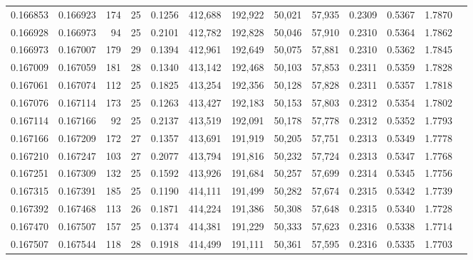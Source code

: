 \begin{tabular}{rrrrrrrrrrrrr}
0.166853 & 0.166923 & 174 &  25 &                                     0.1256 & 412,688 & 192,922 &  50,021 &  57,935 & 0.2309 & 0.5367 & 1.7870 \\
0.166928 & 0.166973 &  94 &  25 &                                     0.2101 & 412,782 & 192,828 &  50,046 &  57,910 & 0.2310 & 0.5364 & 1.7862 \\
0.166973 & 0.167007 & 179 &  29 &                                     0.1394 & 412,961 & 192,649 &  50,075 &  57,881 & 0.2310 & 0.5362 & 1.7845 \\
0.167009 & 0.167059 & 181 &  28 &                                     0.1340 & 413,142 & 192,468 &  50,103 &  57,853 & 0.2311 & 0.5359 & 1.7828 \\
0.167061 & 0.167074 & 112 &  25 &                                     0.1825 & 413,254 & 192,356 &  50,128 &  57,828 & 0.2311 & 0.5357 & 1.7818 \\
0.167076 & 0.167114 & 173 &  25 &                                     0.1263 & 413,427 & 192,183 &  50,153 &  57,803 & 0.2312 & 0.5354 & 1.7802 \\
0.167114 & 0.167166 &  92 &  25 &                                     0.2137 & 413,519 & 192,091 &  50,178 &  57,778 & 0.2312 & 0.5352 & 1.7793 \\
0.167166 & 0.167209 & 172 &  27 &                                     0.1357 & 413,691 & 191,919 &  50,205 &  57,751 & 0.2313 & 0.5349 & 1.7778 \\
0.167210 & 0.167247 & 103 &  27 &                                     0.2077 & 413,794 & 191,816 &  50,232 &  57,724 & 0.2313 & 0.5347 & 1.7768 \\
0.167251 & 0.167309 & 132 &  25 &                                     0.1592 & 413,926 & 191,684 &  50,257 &  57,699 & 0.2314 & 0.5345 & 1.7756 \\
0.167315 & 0.167391 & 185 &  25 &                                     0.1190 & 414,111 & 191,499 &  50,282 &  57,674 & 0.2315 & 0.5342 & 1.7739 \\
0.167392 & 0.167468 & 113 &  26 &                                     0.1871 & 414,224 & 191,386 &  50,308 &  57,648 & 0.2315 & 0.5340 & 1.7728 \\
0.167470 & 0.167507 & 157 &  25 &                                     0.1374 & 414,381 & 191,229 &  50,333 &  57,623 & 0.2316 & 0.5338 & 1.7714 \\
0.167507 & 0.167544 & 118 &  28 &                                     0.1918 & 414,499 & 191,111 &  50,361 &  57,595 & 0.2316 & 0.5335 & 1.7703 \\

\end{tabular}
